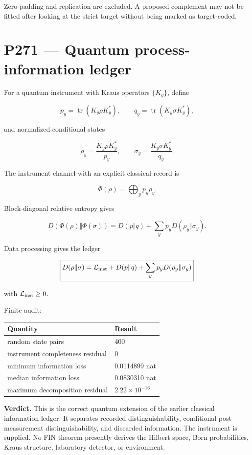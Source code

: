 \documentclass[11pt,a4paper,openany]{report}
\begin{document}
Zero-padding and replication are excluded. A proposed complement may not be fitted after looking at the strict target without being marked as target-coded.

\chapter{P271 --- Quantum process-information ledger}

For a quantum instrument with Kraus operators \(\{K_y\}\), define

\[
p_y=\operatorname{tr}(K_y\rho K_y^\ast),\qquad
q_y=\operatorname{tr}(K_y\sigma K_y^\ast),
\]

and normalized conditional states

\[
\rho_y=\frac{K_y\rho K_y^\ast}{p_y},\qquad
\sigma_y=\frac{K_y\sigma K_y^\ast}{q_y}.
\]

The instrument channel with an explicit classical record is

\[
\Phi(\rho)
=
\bigoplus_y p_y\rho_y.
\]

Block-diagonal relative entropy gives

\[
D(\Phi(\rho)\Vert\Phi(\sigma))
=
D(p\Vert q)
+
\sum_y p_yD(\rho_y\Vert\sigma_y).
\]

Data processing gives the ledger

\[
\boxed{
D(\rho\Vert\sigma)
=
\mathcal L_{\rm inst}
+
D(p\Vert q)
+
\sum_y p_yD(\rho_y\Vert\sigma_y)
}
\]

with \(\mathcal L_{\rm inst}\ge0\).

Finite audit:

\begin{center}
\begingroup\small
\setlength{\tabcolsep}{2.5pt}
\renewcommand{\arraystretch}{1.16}
\begin{longtable}{@{}p{}p{}@{}}
\toprule
\textbf{Quantity} & \textbf{Result} \\
\midrule
\endhead
random state pairs & 400 \\
instrument completeness residual & 0 \\
minimum information loss & 0.0114899 nat \\
median information loss & 0.0830310 nat \\
maximum decomposition residual & \(2.22\times10^{-16}\) \\
\bottomrule
\end{longtable}
\endgroup
\end{center}

\textbf{Verdict.} This is the correct quantum extension of the earlier classical information ledger. It separates recorded distinguishability, conditional post-measurement distinguishability, and discarded information. The instrument is supplied. No FIN theorem presently derives the Hilbert space, Born probabilities, Kraus structure, laboratory detector, or environment.
\end{document}
